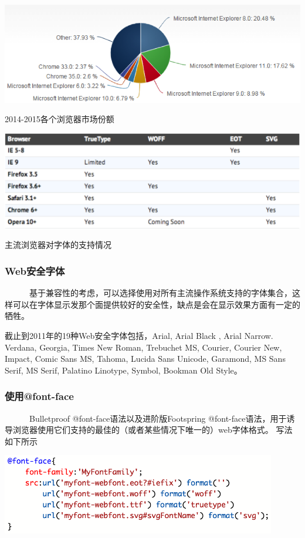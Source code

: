 \documentclass[a4paper]{article}
\begin{document}
\makeatletter
\def\@captype{figure}
\makeatother
\includegraphics [width=1\textwidth]{Jing_fig7.png} 
\caption{2014-2015各个浏览器市场份额}
\label{Jing_browser}

\makeatletter
\def\@captype{figure}
\makeatother
\includegraphics [width=1\textwidth]{Jing_fig10.png} 
\caption{主流浏览器对字体的支持情况}
\label{Jing_fig10}

\subsubsection{ Web安全字体}

~~~~~~基于兼容性的考虑，可以选择使用对所有主流操作系统支持的字体集合，这样可以在字体显示发那个面提供较好的安全性，缺点是会在显示效果方面有一定的牺牲。

截止到2011年的19种Web安全字体包括，Arial, Arial Black , Arial Narrow. Verdana, Georgia, Times New Roman, Trebuchet MS, Courier, Courier New, Impact, Comic Sans MS, Tahoma, Lucida Sans Unicode, Garamond, MS Sans Serif, MS Serif, Palatino Linotype, Symbol, Bookman Old Style。

\subsubsection{ 使用@font-face}

~~~~~~Bulletproof @font-face语法以及进阶版Footspring @font-face语法，用于诱导浏览器使用它们支持的最佳的（或者某些情况下唯一的）web字体格式。
写法如下所示

\makeatletter
\def\@captype{figure}
\makeatother
\includegraphics [width=0.9\textwidth]{Jing_fig11.png} 
\label{Jing_fig11}
\end{document}
